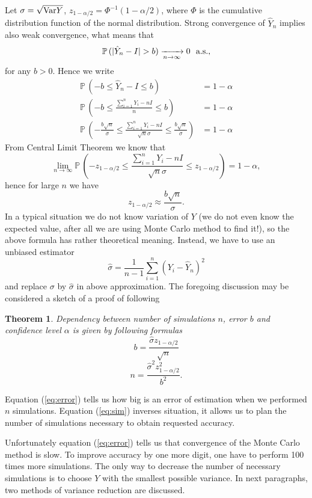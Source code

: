 \documentclass[a4paper,11pt, twoside]{book}
\newtheorem{thm}{Theorem}[chapter]
\theoremstyle{definition}
\theoremstyle{remark}
\def\Var{{\rm Var}}
\def\P{{\mathbb{P}}\,}
\def\conv{\xrightarrow[n \rightarrow \infty]{}}
\def\limn{\lim\limits_{n \rightarrow \infty} }
\begin{document}
Let $\sigma = \sqrt{\Var{Y}}$, $z_{1-\alpha/2} = \Phi^{-1}(1-\alpha/2)$, where $\Phi$ is the cumulative distribution function of the normal distribution.
Strong convergence of $\hat{Y}_n$ implies also weak convergence, what means that
\[ \P(|\hat{Y}_n - I| > b) \conv 0 \hbox{\ \ a.s.,} \]
for any $b > 0$. 
Hence we write
\begin{align*}
 \P(-b \leq \hat{Y}_n - I \leq b) &= 1 - \alpha\\
 \P(-b \leq \frac{\sum\limits_{i=1}^n Y_i - nI}{n}  \leq b) &= 1 - \alpha\\
 \P(-\frac{b\sqrt{n}}{\sigma} \leq \frac{\sum\limits_{i=1}^n Y_i - nI}{\sqrt{n}\sigma}  \leq \frac{b\sqrt{n}}{\sigma}) &= 1 - \alpha
\end{align*}
From Central Limit Theorem we know that
\[ \limn \P(-z_{1-\alpha/2} \leq \frac{\sum\limits_{i=1}^n Y_i - nI}{\sqrt{n}\sigma}  \leq z_{1-\alpha/2}) = 1 - \alpha, \]
hence for large $n$ we have
\[z_{1-\alpha/2} \approx \frac{b\sqrt{n}}{\sigma}.\]
In a typical situation we do not know variation of $Y$ (we do not even know the expected value, after all we are using Monte Carlo method to find it!), so the above formula has rather theoretical meaning.
Instead, we have to use an unbiased estimator
\[ \hat{\sigma} = \frac{1}{n-1}\sum\limits_{i=1}^n (Y_i - \hat{Y}_n)^2 \]
and replace $\sigma$ by $\hat{\sigma}$ in above approximation. The foregoing discussion may be considered a sketch of a proof of following
\begin{thm}
 Dependency between number of simulations $n$, error $b$ and confidence level $\alpha$ is given by following formulas
 \begin{equation}
   \label{eq:error}
   b = \frac{\hat{\sigma} z_{1-\alpha/2}}{\sqrt{n}}
 \end{equation}
 \begin{equation}
   \label{eq:sim}
   n = \frac{\hat{\sigma}^2 z_{1-\alpha/2}^2}{b^2}.
 \end{equation}
\end{thm}
\noindent Equation (\ref{eq:error}) tells us how big is an error of estimation when we performed $n$ simulations. Equation (\ref{eq:sim}) inverses situation, it allows us to plan the number of simulations necessary to obtain requested accuracy.

Unfortunately equation (\ref{eq:error}) tells us that convergence of the Monte Carlo method is slow. To improve accuracy by one more digit, one have to perform 100 times more simulations. The only way to decrease the number of necessary simulations is to choose $Y$ with the smallest possible variance. In next paragraphs, two methods of variance reduction are discussed.
\end{document}
